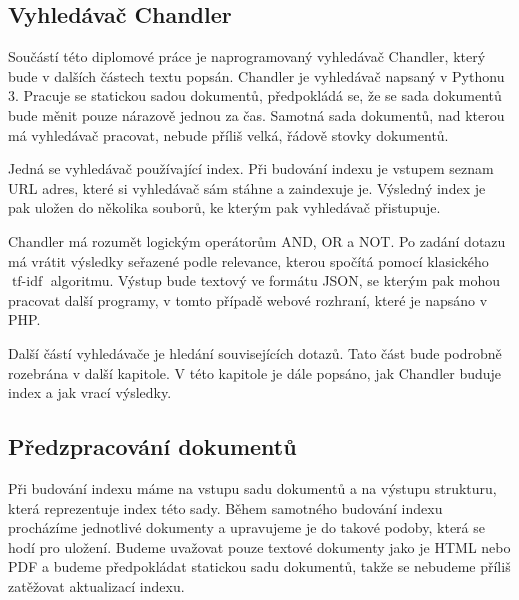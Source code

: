 \documentclass[12pt]{article}
\newcommand{\name}{Chandler}
\DeclareMathOperator{\tfidf}{tf-idf}
\begin{document}
\subsection{Vyhledávač \name}

Součástí této diplomové práce je naprogramovaný vyhledávač \name, který bude v dalších částech textu popsán. \name{} je vyhledávač napsaný v Pythonu 3. Pracuje se statickou sadou dokumentů, předpokládá se, že se sada dokumentů bude měnit pouze nárazově jednou za čas. Samotná sada dokumentů, nad kterou má vyhledávač pracovat, nebude příliš velká, řádově stovky dokumentů. 

Jedná se vyhledávač používající index. Při budování indexu je vstupem seznam URL adres, které si vyhledávač sám stáhne a zaindexuje je. Výsledný index je pak uložen do několika souborů, ke kterým pak vyhledávač přistupuje. 

\name{} má rozumět logickým operátorům AND, OR a NOT. Po zadání dotazu má vrátit výsledky seřazené podle relevance, kterou spočítá pomocí klasického $\tfidf$ algoritmu. Výstup bude textový ve formátu JSON, se kterým pak mohou pracovat další programy, v tomto případě webové rozhraní, které je napsáno v PHP. 

Další částí vyhledávače je hledání souvisejících dotazů. Tato část bude podrobně rozebrána v další kapitole. V této kapitole je dále popsáno, jak \name{} buduje index a jak vrací výsledky. 



\subsection{Předzpracování dokumentů}
\label{prepr}
Při budování indexu máme na vstupu sadu dokumentů a na výstupu strukturu, která reprezentuje index této sady. Během samotného budování indexu procházíme jednotlivé dokumenty a upravujeme je do takové podoby, která se hodí pro uložení. Budeme uvažovat pouze textové dokumenty jako je HTML nebo PDF a budeme předpokládat statickou sadu dokumentů, takže se nebudeme příliš zatěžovat aktualizací indexu. 
\end{document}
